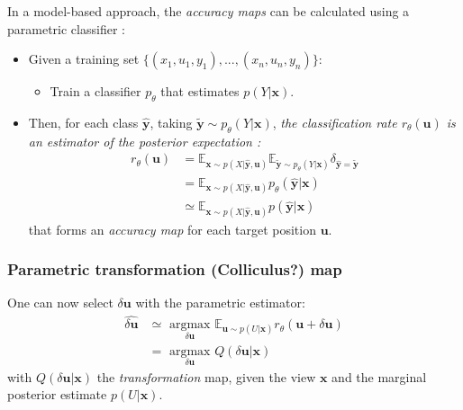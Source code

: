 In a model-based approach, the \emph{accuracy maps} can be calculated using a parametric classifier :
 \begin{itemize}
 \item Given a training set $\{(x_1, u_1, y_1), ..., (x_n, u_n, y_n)\}$:
 \begin{itemize}
 \item Train a classifier $p_\theta$ that estimates $p(Y|\boldsymbol{x})$.
 \end{itemize}
 \item Then, for each class $\hat{\boldsymbol{y}}$, taking $\tilde{\boldsymbol{y}}\sim p_\theta(Y|\boldsymbol{x})$,\emph{ the classification rate $r_\theta(\boldsymbol{u})$ is an estimator of the posterior expectation :}
 \begin{align*}
 r_\theta(\boldsymbol{u})
 &= \mathbb{E}_{ \boldsymbol{x} \sim p(X|\hat{\boldsymbol{y}}, \boldsymbol{u})}
 \mathbb{E}_{\tilde{\boldsymbol{y}}\sim p_\theta(Y|\boldsymbol{x})} \delta_{\hat{\boldsymbol{y}}=\tilde{\boldsymbol{y}}}\\
 &= \mathbb{E}_{ \boldsymbol{x} \sim p(X|\hat{\boldsymbol{y}}, \boldsymbol{u})} p_\theta(\hat{\boldsymbol{y}}|\boldsymbol{x})\\
 &\simeq \mathbb{E}_{ \boldsymbol{x} \sim p(X|\hat{\boldsymbol{y}}, \boldsymbol{u})} p(\hat{\boldsymbol{y}}|\boldsymbol{x})
 \end{align*}
 that forms an \emph{accuracy map} for each target position $\boldsymbol{u}$.\\
 \end{itemize}

\subsubsection{Parametric transformation (Colliculus?) map}

One can now select $\delta\boldsymbol{u}$ with the parametric estimator:
\begin{align*}
\widehat{\delta\boldsymbol{u}} &\simeq \underset{\delta\boldsymbol{u}}{\text{ argmax }}
\mathbb{E}_{\boldsymbol{u}\sim p(U|\boldsymbol{x})}
r_\theta(\boldsymbol{u}+\delta\boldsymbol{u})\\
&= \underset{\delta\boldsymbol{u}}{\text{ argmax }} Q(\delta\boldsymbol{u}|\boldsymbol{x})
\end{align*}
with $Q(\delta\boldsymbol{u}|\boldsymbol{x})$ the \emph{transformation} map, given the view $\boldsymbol{x}$ and the marginal posterior estimate $p(U|\boldsymbol{x})$.

